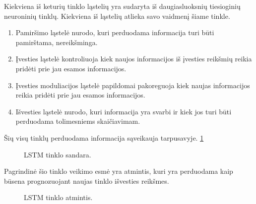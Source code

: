 Kiekviena iš keturių tinklo ląstelių yra sudaryta iš daugiasluoksnių tiesioginių neuroninių tinklų. Kiekviena iš ląstelių atlieka savo vaidmenį šiame tinkle.

\begin{enumerate}
  \item Pamiršimo ląstelė nurodo, kuri perduodama informacija turi būti pamirštama, nereikšminga.
  \item Įvesties ląstelė kontroliuoja kiek naujos informacijos iš įvesties reikšmių reikia pridėti prie jau esamos informacijos.
  \item Įvesties moduliacijos ląstelė papildomai pakoreguoja kiek naujas informacijos reikia pridėti prie jau esamos informacijos.
  \item Išvesties ląstelė nurodo, kuri informacija yra svarbi ir kiek jos turi būti perduodama tolimesniems skaičiavimam.
\end{enumerate}

Šių visų tinklų perduodama informacija sąveikauja tarpusavyje. \ref{fig:lstmveikimas}

\begin{figure}[h!]
  \centering
{}
\caption{LSTM tinklo sandara.}
\label{fig:lstmveikimas}
\end{figure}

Pagrindinė šio tinklo veikimo esmė yra atmintis, kuri yra perduodama kaip būsena prognozuojant naujas tinklo išvesties reikšmes.

\begin{figure}[h!]
  \centering
{}
\caption{LSTM tinklo atmintis.}
\label{fig:lstmcore}
\end{figure}

